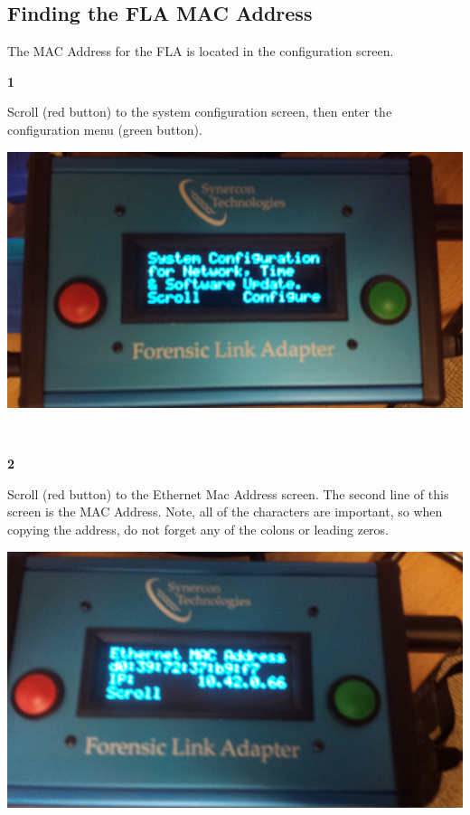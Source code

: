 \documentclass[11pt]{article}
\begin{document}
\subsection{Finding the FLA MAC Address}
\label{subsec:finding_mac}
The MAC Address for the FLA is located in the configuration screen.
\\[\baselineskip]
\noindent\begin{minipage}{0.3\textwidth}%
\begin{center}
\textbf{1}\\[\baselineskip]
\end{center}
Scroll (red button) to the system configuration screen, then enter the configuration menu (green button).
\end{minipage}%
\hfill%
\begin{minipage}{0.6\textwidth}
\includegraphics[width=\linewidth]{./fla_screens/sys_conf}
\end{minipage}
\\[\baselineskip]
\noindent\begin{minipage}{0.3\textwidth}%
\begin{center}
\textbf{2}\\[\baselineskip]
\end{center}
Scroll (red button) to the Ethernet Mac Address screen. The second line of this screen is the MAC Address. Note, all of the characters are important, so when copying the address, do not forget any of the colons or leading zeros.
\end{minipage}%
\hfill%
\begin{minipage}{0.6\textwidth}
\includegraphics[width=\linewidth]{./fla_screens/sys_conf_mac}
\end{minipage}
\\
\end{document}
